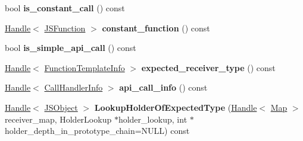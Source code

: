 \begin{DoxyCompactItemize}
\item 
bool {\bfseries is\+\_\+constant\+\_\+call} () const \hypertarget{classv8_1_1internal_1_1_b_a_s_e___e_m_b_e_d_d_e_d_a6cefe3c9d1c90b70feb3e71c4da9d274}{}\label{classv8_1_1internal_1_1_b_a_s_e___e_m_b_e_d_d_e_d_a6cefe3c9d1c90b70feb3e71c4da9d274}

\item 
\hyperlink{classv8_1_1internal_1_1_handle}{Handle}$<$ \hyperlink{classv8_1_1internal_1_1_j_s_function}{J\+S\+Function} $>$ {\bfseries constant\+\_\+function} () const \hypertarget{classv8_1_1internal_1_1_b_a_s_e___e_m_b_e_d_d_e_d_a46fea85ce148f89143e0cbb949cf6270}{}\label{classv8_1_1internal_1_1_b_a_s_e___e_m_b_e_d_d_e_d_a46fea85ce148f89143e0cbb949cf6270}

\item 
bool {\bfseries is\+\_\+simple\+\_\+api\+\_\+call} () const \hypertarget{classv8_1_1internal_1_1_b_a_s_e___e_m_b_e_d_d_e_d_a09eb73a16fd927e9a6ee73d462f9082a}{}\label{classv8_1_1internal_1_1_b_a_s_e___e_m_b_e_d_d_e_d_a09eb73a16fd927e9a6ee73d462f9082a}

\item 
\hyperlink{classv8_1_1internal_1_1_handle}{Handle}$<$ \hyperlink{classv8_1_1internal_1_1_function_template_info}{Function\+Template\+Info} $>$ {\bfseries expected\+\_\+receiver\+\_\+type} () const \hypertarget{classv8_1_1internal_1_1_b_a_s_e___e_m_b_e_d_d_e_d_a3ede930e45227013fb84d562a4c3788d}{}\label{classv8_1_1internal_1_1_b_a_s_e___e_m_b_e_d_d_e_d_a3ede930e45227013fb84d562a4c3788d}

\item 
\hyperlink{classv8_1_1internal_1_1_handle}{Handle}$<$ \hyperlink{classv8_1_1internal_1_1_call_handler_info}{Call\+Handler\+Info} $>$ {\bfseries api\+\_\+call\+\_\+info} () const \hypertarget{classv8_1_1internal_1_1_b_a_s_e___e_m_b_e_d_d_e_d_a320bac6e5844fbde47bd27a15954196f}{}\label{classv8_1_1internal_1_1_b_a_s_e___e_m_b_e_d_d_e_d_a320bac6e5844fbde47bd27a15954196f}

\item 
\hyperlink{classv8_1_1internal_1_1_handle}{Handle}$<$ \hyperlink{classv8_1_1internal_1_1_j_s_object}{J\+S\+Object} $>$ {\bfseries Lookup\+Holder\+Of\+Expected\+Type} (\hyperlink{classv8_1_1internal_1_1_handle}{Handle}$<$ \hyperlink{classv8_1_1internal_1_1_map}{Map} $>$ receiver\+\_\+map, Holder\+Lookup $\ast$holder\+\_\+lookup, int $\ast$holder\+\_\+depth\+\_\+in\+\_\+prototype\+\_\+chain=N\+U\+LL) const \hypertarget{classv8_1_1internal_1_1_b_a_s_e___e_m_b_e_d_d_e_d_a2261a8f1a1d8f7657134a6d25d6beebc}{}\label{classv8_1_1internal_1_1_b_a_s_e___e_m_b_e_d_d_e_d_a2261a8f1a1d8f7657134a6d25d6beebc}


\end{DoxyCompactItemize}
